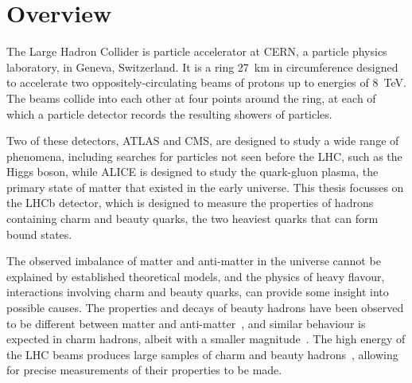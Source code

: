 \chapter{Overview}
\label{chap:intro:overview}

The Large Hadron Collider is particle accelerator at CERN, a particle physics 
laboratory, in Geneva, Switzerland.
It is a ring \SI{27}{\kilo\metre} in circumference designed to accelerate two 
oppositely-circulating beams of protons up to energies of \SI{8}{\TeV}.
The beams collide into each other at four points around the ring, at each of 
which a particle detector records the resulting showers of particles.


Two of these detectors, ATLAS and CMS, are designed to study a wide range of 
phenomena, including searches for particles not seen before the \ac{LHC}, such 
as the Higgs boson, while ALICE is designed to study the quark-gluon plasma, 
the primary state of matter that existed in the early universe.
This thesis focusses on the LHCb detector, which is designed to measure the 
properties of hadrons containing charm and beauty quarks, the two heaviest 
quarks that can form bound states.

The observed imbalance of matter and anti-matter in the universe cannot be 
explained by established theoretical models, and the physics of heavy flavour, 
interactions involving charm and beauty quarks, can provide some insight into 
possible causes.
The properties and decays of beauty hadrons have been observed to be different 
between matter and 
anti-matter~\cite{Aubert:2001nu,Abe:2001xe,Aaij:2012kz,Aaij:2013iua,Aaij:2016cla}, 
and similar behaviour is expected in charm hadrons, albeit with a smaller 
magnitude~\cite{Grossman:2006jg}.
The high energy of the \ac{LHC} beams produces large samples of charm and 
beauty hadrons~\cite{LHCb-PAPER-2012-041,LHCb-PAPER-2013-004}, allowing for 
precise measurements of their properties to be made.


